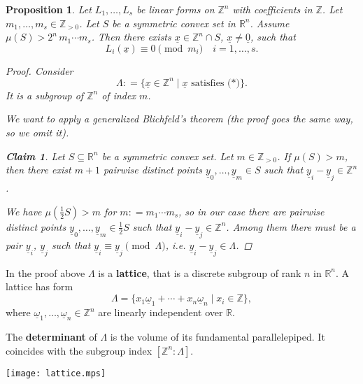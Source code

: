 \documentclass{article}
\newcommand{\term}{\textbf}
\newcommand{\dfn}{\mathrel{\mathop:}=}
\newcommand{\ZZ}{\mathbb{Z}}
\theoremstyle{myplain}
\newtheorem{proposition}{Proposition}[section]
\newtheorem*{claim}{Claim}
\theoremstyle{mydefinition}
\begin{document}
\begin{proposition}
  Let $L_1,\ldots,L_s$ be linear forms on $\ZZ^n$ with coefficients in
  $\ZZ$. Let $m_1, \ldots, m_s \in \ZZ_{> 0}$. Let $S$ be a symmetric convex set
  in $\mathbb{R}^n$. Assume $\mu (S) > 2^n \, m_1\cdots m_s$. Then there exists
  $\underline{x} \in \ZZ^n \cap S$, $\underline{x} \ne \underline{0}$, such that
  \[ \tag{*} L_i (\underline{x}) \equiv 0 \pmod{m_i} \quad i = 1,\ldots,s. \]

  \begin{proof}
    Consider
    \[ \Lambda \dfn \{ \underline{x} \in \ZZ^n \mid \underline{x} \text{ satisfies (*)} \}. \]
    It is a subgroup of $\ZZ^n$ of index $m$.

    We want to apply a generalized Blichfeld's theorem (the proof goes the same
    way, so we omit it).

    \begin{claim}
      Let $S \subseteq \mathbb{R}^n$ be a symmetric convex set. Let
      $m \in \ZZ_{> 0}$. If $\mu (S) > m$, then there exist $m+1$ pairwise
      distinct points $\underline{y}_0, \ldots, \underline{y}_m \in S$ such that
      $\underline{y}_i - \underline{y}_j \in \ZZ^n$.
    \end{claim}

    We have $\mu (\frac{1}{2} S) > m$ for $m \dfn m_1\cdots m_s$, so in our case
    there are pairwise distinct points
    $\underline{y}_0, \ldots, \underline{y}_m \in \frac{1}{2} S$ such that
    $\underline{y}_i - \underline{y}_j \in \ZZ^n$. Among them there must be a
    pair $\underline{y}_i$, $\underline{y}_j$ such that
    $\underline{y}_i \equiv \underline{y}_j \pmod{\Lambda}$,
    i.e. $\underline{y}_i - \underline{y}_j \in \Lambda$.
  \end{proof}
\end{proposition}

In the proof above $\Lambda$ is a \term{lattice}, that is a discrete subgroup of
rank $n$ in $\mathbb{R}^n$. A lattice has form
$$\Lambda = \{ x_1 \underline{\omega}_1 + \cdots + x_n \underline{\omega}_n \mid x_i \in \ZZ \},$$
where $\underline{\omega}_1, \ldots, \underline{\omega}_n \in \ZZ^n$ are
linearly independent over $\mathbb{R}$.

The \term{determinant} of $\Lambda$ is the volume of its fundamental
parallelepiped. It coincides with the subgroup index $[\ZZ^n : \Lambda]$.

\begin{center}
  \texttt{[image: lattice.mps]}
\end{center}
\end{document}
